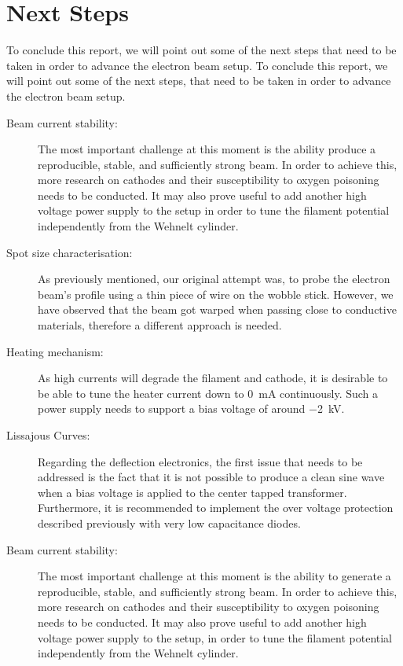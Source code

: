 
\chapter{Next Steps}

To conclude this report, we will point out some of the next steps that need to be taken in order to advance the electron beam setup. 
To conclude this report, we will point out some of the next steps, that need to be taken in order to advance the electron beam setup. 

\begin{description}
	\item[Beam current stability:] The most important challenge at this moment is the ability produce a reproducible, stable, and sufficiently strong beam. In order to achieve this, more research on cathodes and their susceptibility to oxygen poisoning needs to be conducted. It may also prove useful to add another high voltage power supply to the setup in order to tune the filament potential independently from the Wehnelt cylinder. 
	\item[Spot size characterisation:] As previously mentioned, our original attempt was, to probe the electron beam's profile using a thin piece of wire on the wobble stick. However, we have observed that the beam got warped when passing close to conductive materials, therefore a different approach is needed. 
	\item[Heating mechanism:] As high currents will degrade the filament and cathode, it is desirable to be able to tune the heater current down to \SI{0}{\milli\ampere} continuously. Such a power supply needs to support a bias voltage of around \SI{-2}{\kilo\volt}. 
	\item[Lissajous Curves:] Regarding the deflection electronics, the first issue that needs to be addressed is the fact that it is not possible to produce a clean sine wave when a bias voltage is applied to  the center tapped transformer. Furthermore, it is recommended to implement the over voltage protection described previously with very low capacitance diodes.  
	\item[Beam current stability:] The most important challenge at this moment is the ability to generate a reproducible, stable, and sufficiently strong beam. In order to achieve this, more research on cathodes and their susceptibility to oxygen poisoning needs to be conducted. It may also prove useful to add another high voltage power supply to the setup, in order to tune the filament potential independently from the Wehnelt cylinder. 

\end{description}
